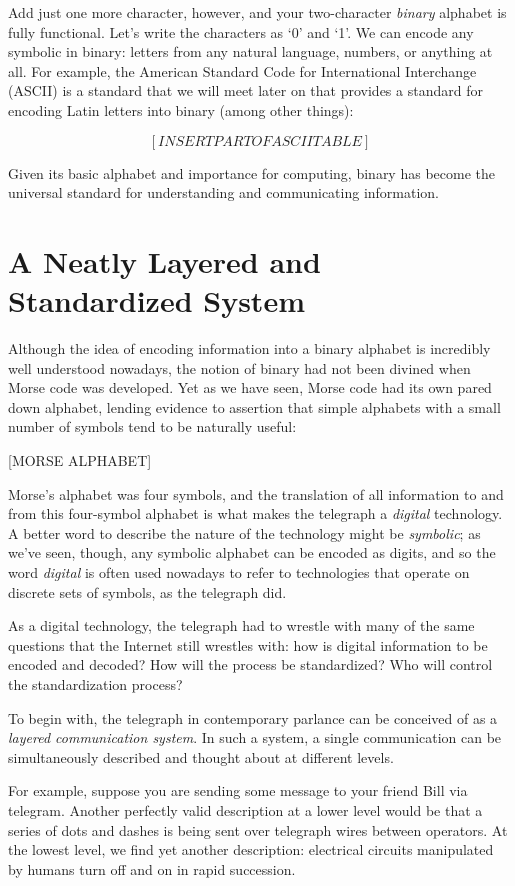 \documentclass{book}
\begin{document}
Add just one more character, however, and your two-character \emph{binary} alphabet is fully functional. Let's write the characters as `0' and `1'. We can encode any symbolic in binary: letters from any natural language, numbers, or anything at all. For example, the American Standard Code for International Interchange (ASCII) is a standard that we will meet later on that provides a standard for encoding Latin letters into binary (among other things):

\[ [INSERT PART OF ASCII TABLE] \]

Given its basic alphabet and importance for computing, binary has become the universal standard for understanding and communicating information.

\section{A Neatly Layered and Standardized System}

Although the idea of encoding information into a binary alphabet is incredibly well understood nowadays, the notion of binary had not been divined when Morse code was developed. Yet as we have seen, Morse code had its own pared down alphabet, lending evidence to assertion that simple alphabets with a small number of symbols tend to be naturally useful:

[MORSE ALPHABET]

Morse's alphabet was four symbols, and the translation of all information to and from this four-symbol alphabet is what makes the telegraph a \emph{digital} technology. A better word to describe the nature of the technology might be \emph{symbolic}; as we've seen, though, any symbolic alphabet can be encoded as digits, and so the word \emph{digital} is often used nowadays to refer to technologies that operate on discrete sets of symbols, as the telegraph did.

As a digital technology, the telegraph had to wrestle with many of the same questions that the Internet still wrestles with: how is digital information to be encoded and decoded? How will the process be standardized? Who will control the standardization process?

To begin with, the telegraph in contemporary parlance can be conceived of as a \emph{layered communication system}. In such a system, a single communication can be simultaneously described and thought about at different levels.

For example, suppose you are sending some message to your friend Bill via telegram. Another perfectly valid description at a lower level would be that a series of dots and dashes is being sent over telegraph wires between operators. At the lowest level, we find yet another description: electrical circuits manipulated by humans turn off and on in rapid succession.
\end{document}
